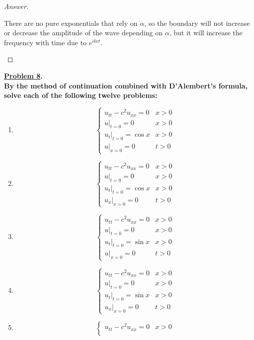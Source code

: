 \documentclass{article}
\theoremstyle{definition}
\renewcommand\qedsymbol{$\blacksquare$}
\newenvironment{ans}{\begin{proof}[Answer]\renewcommand{\qedsymbol}{}}{\end{proof}}
\newenvironment{boldenv}{\bfseries\boldmath}{}
\begin{document}
\begin{ans}
\begin{enumerate}
    There are no pure exponentials that rely on $\alpha$, so the boundary will not increase or decrease the amplitude of the wave depending on $\alpha$, but it will increase the frequency with time due to $e^{ikct}$.
\end{enumerate}
\end{ans}

\begin{boldenv}
    \underline{Problem 8}. \\
    By the method of continuation combined with D'Alembert's formula, solve each of the following twelve problems:
    \begin{enumerate}[(1), start=9]
        \item \[\begin{cases}
            u_{tt} - c^2u_{xx} = 0 & x > 0\\
            u|_{t=0} = 0 & x > 0\\
            u_t|_{t=0} = \cos{x} & x > 0\\
            u|_{x = 0} = 0 & t > 0
        \end{cases}\]
        \item \[\begin{cases}
            u_{tt} - c^2u_{xx} = 0 & x > 0\\
            u|_{t=0} = 0 & x > 0\\
            u_t|_{t=0} = \cos{x} & x > 0\\
            u_x|_{x = 0} = 0 & t > 0
        \end{cases}\]
        \item \[\begin{cases}
            u_{tt} - c^2u_{xx} = 0 & x > 0\\
            u|_{t=0} = 0 & x > 0\\
            u_t|_{t=0} = \sin{x} & x > 0\\
            u|_{x = 0} = 0 & t > 0
        \end{cases}\]
        \item \[\begin{cases}
            u_{tt} - c^2u_{xx} = 0 & x > 0\\
            u|_{t=0} = 0 & x > 0\\
            u_t|_{t=0} = \sin{x} & x > 0\\
            u_x|_{x = 0} = 0 & t > 0
        \end{cases}\]
        \item \[\begin{cases}
            u_{tt} - c^2u_{xx} = 0 & x > 0\\

\end{cases}\]
\end{enumerate}
\end{boldenv}
\end{document}
